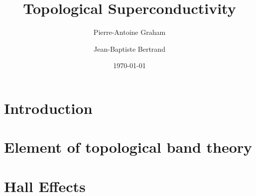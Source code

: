 




\title{Topological Superconductivity} 

\author{Pierre-Antoine Graham}
\author{Jean-Baptiste Bertrand}


\date{\today}

\begin{abstract}

\end{abstract}

\maketitle

\tableofcontents



\section{\label{sec:intro} Introduction}


\section{\label{sec:kramers} Element of topological band theory}


\section{\label{sec:QSH} Hall Effects}


